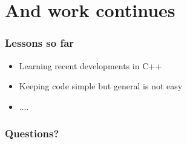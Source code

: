\documentclass[a4paper]{beamer}
\begin{document}
  \section{And work continues}

    \begin{frame}
      \frametitle{Lessons so far}
      \begin{itemize}
        \item Learning recent developments in C++ 
        \item Keeping code simple but general is not easy
        \item ....
      \end{itemize}
    \end{frame}

    \begin{frame}
      \frametitle{Questions?}
    \end{frame}
\end{document}
